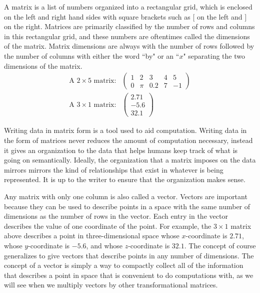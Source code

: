 A matrix is a list of numbers organized into a rectangular grid, which is enclosed on the left and right hand sides with square brackets such as $[$ on the left and $]$ on the right. Matrices are primarily classified by the number of rows and columns in this rectangular grid, and these numbers are oftentimes called the dimensions of the matrix. Matrix dimensions are always with the number of rows followed by the number of columns with either the word ``by" or an ``$x$" separating the two dimensions of the matrix.
\[
\begin{split}
\text{A }2 \times 5 \text{ matrix:}& \begin{pmatrix} 1 & 2 & 3 & 4 & 5 \\ 0 & \pi & 0.2 & 7 & -1 \end{pmatrix} \\
\text{A }3 \times 1\text{ matrix:}& \begin{pmatrix} 2.71 \\ -5.6 \\ 32.1 \end{pmatrix}
\end{split}
\]

Writing data in matrix form is a tool used to aid computation. Writing data in the form of matrices never reduces the amount of computation necessary, instead it gives an organization to the data that helps humans keep track of what is going on semantically. Ideally, the organization that a matrix imposes on the data mirrors mirrors the kind of relationships that exist in whatever is being represented. It is up to the writer to ensure that the organization makes sense. \\


Any matrix with only one column is also called a vector. Vectors are important because they can be used to describe points in a space with the same number of dimensions as the number of rows in the vector. Each entry in the vector describes the value of one coordinate of the point. For example, the $3\times 1$ matrix above describes a point in three-dimensional space whose $x$-coordinate is $2.71$, whose $y$-coordinate is $-5.6$, and whose $z$-coordinate is $32.1$. The concept of course generalizes to give vectors that describe points in any number of dimensions. The concept of a vector is simply a way to compactly collect all of the information that describes a point in space that is convenient to do computations with, as we will see when we multiply vectors by other transformational matrices. \\

